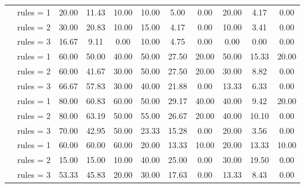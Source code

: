 \begin{table*}[t]
{\begin{tabular}{l c ccc ccc ccc}
           \hdashline
           \multirow{3}{*}{Llama-3.1 405B} & rules = 1 & 20.00 & 11.43 & 10.00 & 10.00 & 5.00 & 0.00 & 20.00 & 4.17 & 0.00\\
           & rules = 2 & 30.00 & 20.83 & 10.00 & 15.00 & 4.17 & 0.00 & 10.00 & 3.41 & 0.00\\
           & \cellcolor{SeaGreen3!30}rules = 3 & \cellcolor{SeaGreen3!30}16.67 & \cellcolor{SeaGreen3!30}9.11 & \cellcolor{SeaGreen3!30}0.00 & \cellcolor{SeaGreen3!30}10.00 & \cellcolor{SeaGreen3!30}4.75 & \cellcolor{SeaGreen3!30}0.00 & \cellcolor{SeaGreen3!30}0.00 & \cellcolor{SeaGreen3!30}0.00 & \cellcolor{SeaGreen3!30}0.00\\
            \hdashline
           \multirow{3}{*}{GPT-4o} & rules = 1 & 60.00 & 50.00 & 40.00 & 50.00 & 27.50 & 20.00 & 50.00 & 15.33 & 20.00\\
           & rules = 2 & 60.00 & 41.67 & 30.00 & 50.00 & 27.50 & 20.00 & 30.00 & 8.82 & 0.00\\
           & \cellcolor{SeaGreen3!30}rules = 3 & \cellcolor{SeaGreen3!30}66.67 & \cellcolor{SeaGreen3!30}57.83 & \cellcolor{SeaGreen3!30}30.00 & \cellcolor{SeaGreen3!30}40.00 & \cellcolor{SeaGreen3!30}21.88 & \cellcolor{SeaGreen3!30}0.00 & \cellcolor{SeaGreen3!30}13.33 & \cellcolor{SeaGreen3!30}6.33 & \cellcolor{SeaGreen3!30}0.00\\
           \hdashline
           \multirow{3}{*}{DeepSeek-V3} & rules = 1 & 80.00 & 60.83 & 60.00 & 50.00 & 29.17 & 40.00 & 40.00 & 9.42 & 20.00\\
           & rules = 2 & 80.00 & 63.19 & 50.00 & 55.00 & 26.67 & 20.00 & 40.00 & 10.10 & 0.00\\
           & \cellcolor{SeaGreen3!30}rules = 3 & \cellcolor{SeaGreen3!30}70.00 & \cellcolor{SeaGreen3!30}42.95 & \cellcolor{SeaGreen3!30}50.00 & \cellcolor{SeaGreen3!30}23.33 & \cellcolor{SeaGreen3!30}15.28 & \cellcolor{SeaGreen3!30}0.00 & \cellcolor{SeaGreen3!30}20.00 & \cellcolor{SeaGreen3!30}3.56 & \cellcolor{SeaGreen3!30}0.00\\
           \hdashline
           \multirow{3}{*}{o1-mini} & rules = 1 & 60.00 & 60.00 & 60.00 & 20.00 & 13.33 & 10.00 & 20.00 & 13.33 & 10.00\\
           & rules = 2 & 15.00 & 15.00 & 10.00 & 40.00 & 25.00 & 0.00 & 30.00 & 19.50 & 0.00\\
           & \cellcolor{SeaGreen3!30}rules = 3 & \cellcolor{SeaGreen3!30}53.33 & \cellcolor{SeaGreen3!30}45.83 & \cellcolor{SeaGreen3!30}20.00 & \cellcolor{SeaGreen3!30}30.00 & \cellcolor{SeaGreen3!30}17.63 & \cellcolor{SeaGreen3!30}0.00 & \cellcolor{SeaGreen3!30}13.33 & \cellcolor{SeaGreen3!30}8.43 & \cellcolor{SeaGreen3!30}0.00\\

\end{tabular}}
\end{table*}
